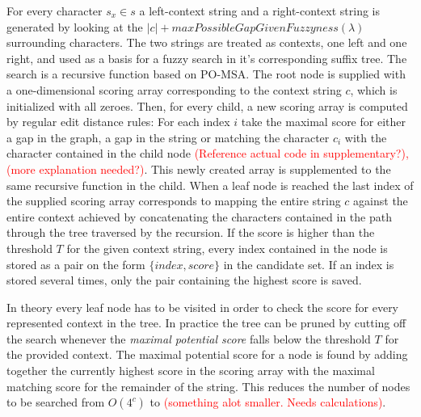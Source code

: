 \documentclass{article}
\begin{document}
\par\noindent
For every character $s_x \in s$ a left-context string and a right-context string is generated by looking at the $|c| + maxPossibleGapGivenFuzzyness(\lambda)$ surrounding characters. The two strings are treated as contexts, one left and one right, and used as a basis for a fuzzy search in it's corresponding suffix tree. The search is a recursive function based on PO-MSA. The root node is supplied with a one-dimensional scoring array corresponding to the context string $c$, which is initialized with all zeroes. Then, for every child, a new scoring array is computed by regular edit distance rules: For each index $i$ take the maximal score for either a gap in the graph, a gap in the string or matching the character $c_i$ with the character contained in the child node \textcolor{red}{(Reference actual code in supplementary?), (more explanation needed?)}. This newly created array is supplemented to the same recursive function in the child. When a leaf node is reached the last index of the supplied scoring array corresponds to mapping the entire string $c$ against the entire context achieved by concatenating the characters contained in the path through the tree traversed by the recursion. If the score is higher than the threshold $T$ for the given context string, every index contained in the node is stored as a pair on the form $\{index, score\}$ in the candidate set. If an index is stored several times, only the pair containing the highest score is saved.\\
\par\noindent
\par
In theory every leaf node has to be visited in order to check the score for every represented context in the tree. In practice the tree can be pruned by cutting off the search whenever the \textit{maximal potential score} falls below the threshold $T$ for the provided context. The maximal potential score for a node is found by adding together the currently highest score in the scoring array with the maximal matching score for the remainder of the string. This reduces the number of nodes to be searched from $O(4^c)$ to \textcolor{red}{(something alot smaller. Needs calculations)}.\\
\clearpage
\end{document}

